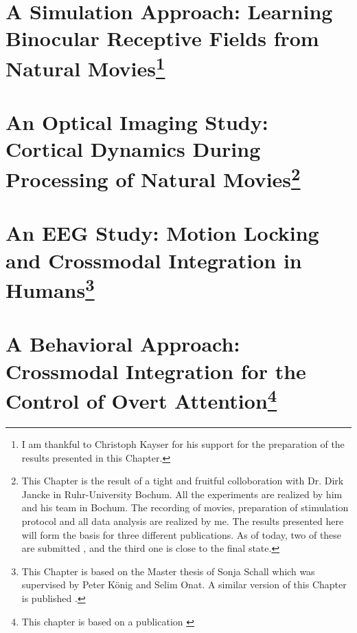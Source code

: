 \documentclass[a4paper,11pt]{report}
\begin{document}
	
	\chapter[A Simulation Approach: Learning Binocular Receptive Fields from Natural
	Movies]{A Simulation Approach: Learning Binocular Receptive Fields from Natural
	Movies\footnote{I am thankful to Christoph Kayser for his support for
	the preparation of the results presented in this Chapter.}} 
	
	\label{part_rf}
	
	
	\chapter[An Optical Imaging Study: Cortical Dynamics During Processing
	of Natural Movies]{An Optical Imaging Study: Cortical Dynamics During
	Processing of Natural Movies\footnote{This Chapter is the result of a
	tight and fruitful colloboration with Dr. Dirk Jancke in
	Ruhr-University Bochum. All the experiments are realized by him and his
	team in Bochum. The recording of movies, preparation of stimulation
	protocol and all data analysis are realized by me. The results
	presented here will form the basis for three different publications. As
	of today, two of these are submitted \citep{Onat2009a, Onat2009b}, and
	the third one \citep{Onat2009c} is close to the final state.}}
	
	\label{part_oi} 
	 
	
	
	\chapter[An EEG Study: Motion Locking and Crossmodal Integration in
	Humans]{An EEG Study: Motion Locking and Crossmodal Integration in
	Humans\footnote{This Chapter is based on the Master thesis of Sonja
	Schall \citep{schall2008a} which was supervised by Peter K\"{o}nig and
	Selim Onat. A similar version of this Chapter is published
	\citep{schall2009a}. }} 
	
	\label{part_eeg} 
	 


\chapter[A Behavioral Approach:
Crossmodal Integration for the Control of Overt Attention]{A Behavioral Approach:
Crossmodal Integration for the Control of Overt Attention\footnote{This chapter is based on a publication \cite{onat2007a}}}
		\label{part_oa} 
		
\end{document}
